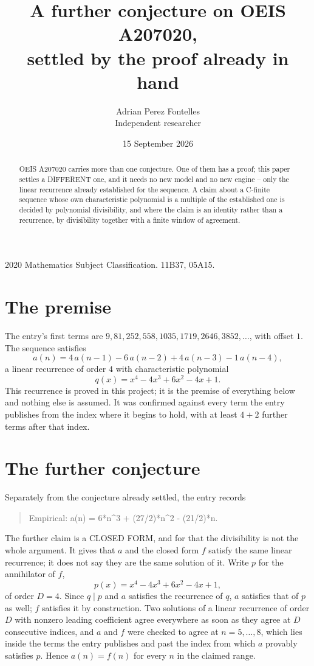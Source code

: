 \documentclass[11pt,a4paper]{article}
\title{A further conjecture on OEIS A207020,\\ \large settled by the proof already in hand}
\author{Adrian Perez Fontelles\\ \small Independent researcher}
\date{15 September 2026}
\theoremstyle{plain}
\theoremstyle{definition}
\begin{document}
\maketitle

\begin{abstract}
OEIS A207020 carries more than one conjecture. One of them has a proof; this paper settles a
DIFFERENT one, and it needs no new model and no new engine -- only the linear recurrence already
established for the sequence. A claim about a C-finite sequence whose own characteristic
polynomial is a multiple of the established one is decided by polynomial divisibility, and where
the claim is an identity rather than a recurrence, by divisibility together with a finite window
of agreement.
\end{abstract}

\noindent\small 2020 Mathematics Subject Classification. 11B37, 05A15.\normalsize

\section{The premise}

The entry's first terms are $9, 81, 252, 558, 1035, 1719, 2646, 3852,\dots$, with offset $1$. The sequence satisfies
\[
  a(n)=4\,a(n-1) - 6\,a(n-2) + 4\,a(n-3) - 1\,a(n-4) ,
\]
a linear recurrence of order $4$ with characteristic polynomial
\[
  q(x)=x^{4} - 4 x^{3} + 6 x^{2} - 4 x + 1 .
\]
This recurrence is proved in this project; it is the premise of everything below and nothing else is assumed.
It was confirmed against every term the entry publishes from the index where it begins to hold,
with at least $4+2$ further terms after that index.

\section{The further conjecture}

Separately from the conjecture already settled, the entry records

\begin{quote}\raggedright Empirical: a(n) = 6*n\^{}3 + (27/2)*n\^{}2 - (21/2)*n.\end{quote}

The further claim is a CLOSED FORM, and for that the divisibility is not the whole argument. It
gives that $a$ and the closed form $f$ satisfy the same linear recurrence; it does not say they
are the same solution of it. Write $p$ for the annihilator of $f$,
\[
  p(x)=x^{4} - 4 x^{3} + 6 x^{2} - 4 x + 1 ,
\]
of order $D=4$. Since $q\mid p$ and $a$ satisfies the recurrence of $q$, $a$ satisfies that of
$p$ as well; $f$ satisfies it by construction. Two solutions of a linear recurrence of order $D$
with nonzero leading coefficient agree everywhere as soon as they agree at $D$ consecutive
indices, and $a$ and $f$ were checked to agree at $n=5,\dots,8$,
which lies inside the terms the entry publishes and past the index from which $a$ provably
satisfies $p$. Hence $a(n)=f(n)$ for every $n$ in the claimed range.
\end{document}
